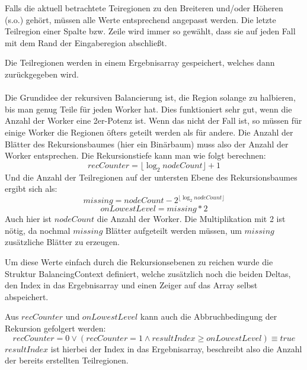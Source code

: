 Falls die aktuell betrachtete Teiregionen zu den Breiteren und/oder Höheren (s.o.) gehört, müssen alle Werte entsprechend angepasst werden.
Die letzte Teilregion einer Spalte bzw. Zeile wird immer so gewählt, dass sie auf jeden Fall mit dem Rand der Eingaberegion abschließt.

Die Teilregionen werden in einem Ergebnisarray gespeichert, welches dann zurückgegeben wird.

\paragraph*{} \label{lastbalancierung_naiv_rekursion}
Die Grundidee der rekursiven Balancierung ist, die Region solange zu halbieren, bis man genug Teile für jeden Worker hat.
Dies funktioniert sehr gut, wenn die Anzahl der Worker eine 2er-Potenz ist. Wenn das nicht der Fall ist, so müssen für einige Worker die Regionen öfters geteilt werden als für andere.
Die Anzahl der Blätter des Rekursionsbaumes (hier ein Binärbaum) muss also der Anzahl der Worker entsprechen.
Die Rekursionstiefe kann man wie folgt berechnen:
\begin{equation} \label{lastbalancierung_rekursion_tiefe}
	recCounter = \lfloor\log_2 nodeCount\rfloor + 1
\end{equation}
Und die Anzahl der Teilregionen auf der untersten Ebene des Rekursionsbaumes ergibt sich als:
\begin{equation*}
	missing = nodeCount - 2^{\lfloor\log_2 nodeCount\rfloor}
\end{equation*}
\begin{equation} \label{lastbalancierung_rekursion_ebene}
	onLowestLevel = missing * 2
\end{equation}
Auch hier ist $nodeCount$ die Anzahl der Worker. Die Multiplikation mit 2 ist nötig, da nochmal $missing$ Blätter aufgeteilt werden müssen, um $missing$ zusätzliche Blätter zu erzeugen.

Um diese Werte einfach durch die Rekursionsebenen zu reichen wurde die Struktur BalancingContext definiert, welche zusätzlich noch die beiden Deltas, den Index in das Ergebnisarray und einen Zeiger auf das Array selbst abspeichert.

Aus $recCounter$ und $onLowestLevel$ kann auch die Abbruchbedingung der Rekursion gefolgert werden:
\begin{equation} \label{lastbalancierung_rekursion_abbruch}
	recCounter = 0 \vee (recCounter = 1 \wedge resultIndex \geq onLowestLevel) \equiv true
\end{equation}
$resultIndex$ ist hierbei der Index in das Ergebnisarray, beschreibt also die Anzahl der bereits erstellten Teilregionen.

